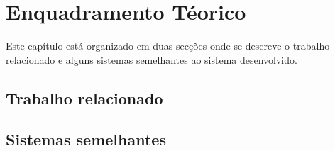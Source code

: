 \chapter{Enquadramento Téorico}\label{ch:enquadramento}

Este capítulo está organizado em duas secções onde se descreve o trabalho relacionado e alguns sistemas semelhantes ao sistema desenvolvido.


\section{Trabalho relacionado}
\lipsum[1-2]


\section{Sistemas semelhantes}
\lipsum[3-5]
